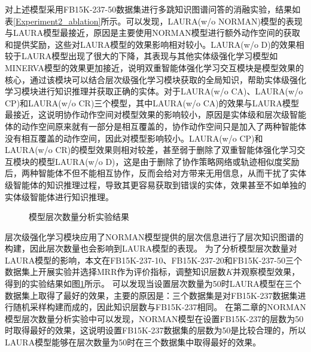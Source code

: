 \documentclass[algorithmlist, AutoFakeBold, AutoFakeSlant, figurelist, tablelist, nomlist, engineering]{seuthesix}
\begin{document}
对上述模型采用FB15K-237-50数据集进行多跳知识图谱问答的消融实验，结果如表\ref{Experiment2_ablation}所示。可以发现，LAURA(w/o NORMAN)模型的表现与LAURA模型最接近，原因是主要使用NORMAN模型进行额外动作空间的获取和提供奖励，这些对LAURA模型的效果影响相对较小。LAURA(w/o D)的效果相较于LAURA模型出现了很大的下降，其表现与其他实体级强化学习模型如MINERVA模型的效果更加接近，说明双重智能体强化学习交互模块是模型效果的核心，通过该模块可以结合层次级强化学习模块获取的全局知识，帮助实体级强化学习模块进行知识推理并获取正确的实体。对于LAURA(w/o CA)、LAURA(w/o CP)和LAURA(w/o CR)三个模型，其中LAURA(w/o CA)的效果与LAURA模型最接近，这说明协作动作空间对模型效果的影响较小，原因是实体级和层次级智能体的动作空间原来就有一部分是相互覆盖的，协作动作空间只是加入了两种智能体没有相互覆盖的动作空间，因此对模型影响较小。LAURA(w/o CP)和LAURA(w/o CR)的模型效果则相对较差，甚至弱于删除了双重智能体强化学习交互模块的模型LAURA(w/o D)，这是由于删除了协作策略网络或轨迹相似度奖励后，两种智能体不但不能相互协作，反而会给对方带来无用信息，从而干扰了实体级智能体的知识推理过程，导致其更容易获取到错误的实体，效果甚至不如单独的实体级智能体进行知识推理。

\begin{figure}[t]
  \centering
  \caption{模型层次数量分析实验结果}
  \label{Experiment2_layer}
\end{figure}
层次级强化学习模块应用了NORMAN模型提供的层次信息进行了层次知识图谱的构建，因此层次数量也会影响到LAURA模型的表现。
为了分析模型层次数量对LAURA模型的影响，本文在FB15K-237-10、FB15K-237-20和FB15K-237-50三个数据集上开展实验并选择MRR作为评价指标，调整知识层数$K$并观察模型效果，得到的实验结果如图\ref{Experiment2_layer}所示。
可以发现当设置层次数量为50时LAURA模型在三个数据集上取得了最好的效果，主要的原因是：三个数据集是对FB15K-237数据集进行随机采样构建而成的，因此知识层数与FB15K-237相同。
在第二章的NORMAN模型层次数量分析实验中可以发现，NORMAN模型在设置FB15K-237的层数为50时取得最好的效果，这说明设置FB15K-237数据集的层数为50是比较合理的，所以LAURA模型能够在层次数量为50时在三个数据集中取得最好的效果。
\end{document}
